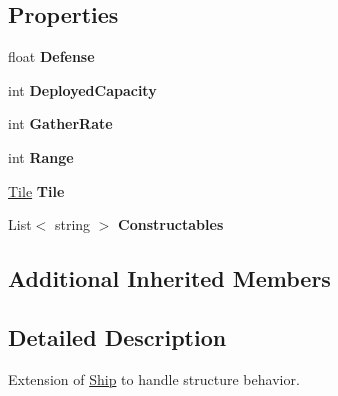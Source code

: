 \subsection*{Properties}
\begin{DoxyCompactItemize}
\item 
\hypertarget{class_structure_af324ae30365d4a5049d57327478185e3}{}float {\bfseries Defense}\label{class_structure_af324ae30365d4a5049d57327478185e3}

\item 
\hypertarget{class_structure_a5ad3b8896676fec813559adb196f5463}{}int {\bfseries Deployed\+Capacity}\label{class_structure_a5ad3b8896676fec813559adb196f5463}

\item 
\hypertarget{class_structure_a194598de7ed6c95771026d8213b945b3}{}int {\bfseries Gather\+Rate}\label{class_structure_a194598de7ed6c95771026d8213b945b3}

\item 
\hypertarget{class_structure_a52d85aae54d96762dd8efc6670ddddb5}{}int {\bfseries Range}\label{class_structure_a52d85aae54d96762dd8efc6670ddddb5}

\item 
\hypertarget{class_structure_a4106be359eca9d8190ac6510c3579777}{}\hyperlink{class_tile}{Tile} {\bfseries Tile}\label{class_structure_a4106be359eca9d8190ac6510c3579777}

\item 
\hypertarget{class_structure_aa04d1ef61b75f78b64b467397e44b435}{}List$<$ string $>$ {\bfseries Constructables}\label{class_structure_aa04d1ef61b75f78b64b467397e44b435}

\end{DoxyCompactItemize}
\subsection*{Additional Inherited Members}


\subsection{Detailed Description}
Extension of \hyperlink{class_ship}{Ship} to handle structure behavior. 



